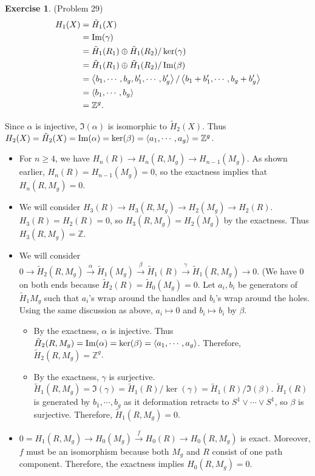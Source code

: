 \documentclass[psamsfonts]{amsart}
\theoremstyle{definition}
\newtheorem*{exer}{Exercise}
\theoremstyle{remark}
\numberwithin{equation}{section}
\begin{document}
\begin{exer}{(Problem 29)}
  \begin{align*}
    H_1(X)
      &= \tilde{H}_1(X) \\
      &= \Im(\gamma) \\
      &= \tilde{H}_1(R_1) \oplus \tilde{H}_1(R_2) / \ker(\gamma) \\
      &= \tilde{H}_1(R_1) \oplus \tilde{H}_1(R_2) / \Im(\beta) \\
      &= \ev{b_1, \cdots, b_g, b_1', \cdots, b_g'} / \ev{b_1 + b_1', \cdots, b_g + b_g'} \\
      &= \ev{b_1, \cdots, b_g} \\
      &= \mathbb{Z}^g.
  \end{align*}

  Since $\alpha$ is injective, $\Im(\alpha)$ is isomorphic to $\tilde{H}_2(X)$.
  Thus $H_2(X) = \tilde{H}_2(X) = \Im(\alpha) = \ker(\beta) = \ev{a_1, \cdots, a_g} = \mathbb{Z}^g$.

  \begin{itemize}
    \item
      For $n \geq 4$, we have $H_n(R) \rightarrow H_n(R, M_g) \rightarrow H_{n - 1}(M_g)$.
      As shown earlier, $H_n(R) = H_{n - 1}(M_g) = 0$, so the exactness implies that $H_n(R, M_g) = 0$.
    \item
      We will consider $H_3(R) \rightarrow H_3(R, M_g) \rightarrow H_2(M_g) \rightarrow H_2(R)$.
      $H_3(R) = H_2(R) = 0$, so $H_3(R, M_g) = H_2(M_g)$ by the exactness.
      Thus $H_3(R, M_g) = \mathbb{Z}$.
    \item
      We will consider $0 \rightarrow \tilde{H}_2(R, M_g) \xrightarrow{\alpha} \tilde{H}_1(M_g) \xrightarrow{\beta} \tilde{H}_1(R) \xrightarrow{\gamma} \tilde{H}_1(R, M_g) \rightarrow 0$.
      (We have 0 on both ends because $\tilde{H}_2(R) = \tilde{H}_0(M_g) = 0$.
      Let $a_i, b_i$ be generators of $\tilde{H}_1{M_g}$ such that $a_i$'s wrap around the handles and $b_i$'s wrap around the holes.
      Using the same discussion as above, $a_i \mapsto 0$ and $b_i \mapsto b_i$ by $\beta$.
      \begin{itemize}
        \item
          By the exactness, $\alpha$ is injective.
          Thus $\tilde{H}_2(R, M_g) = \Im(\alpha) = \ker(\beta) = \ev{a_1, \cdots, a_g}$.
          Therefore, $\tilde{H}_2(R, M_g) = \mathbb{Z}^g$.
        \item
          By the exactness, $\gamma$ is surjective.
          $\tilde{H}_1(R, M_g) = \Im(\gamma) = \tilde{H}_1(R) / \ker(\gamma) = \tilde{H}_1(R) / \Im(\beta)$.
          $\tilde{H}_1(R)$ is generated by $b_1, \cdots, b_g$ as it deformation retracts to $S^1 \vee \cdots \vee S^1$, so $\beta$ is surjective.
          Therefore, $\tilde{H}_1(R, M_g) = 0$.
      \end{itemize}
    \item
      $0 = H_1(R, M_g) \rightarrow H_0(M_g) \xrightarrow{f} H_0(R) \rightarrow H_0(R, M_g)$ is exact.
      Moreover, $f$ must be an isomorphism because both $M_g$ and $R$ consist of one path component.
      Therefore, the exactness implies $H_0(R, M_g) = 0$.
  \end{itemize}
\end{exer}
\end{document}

